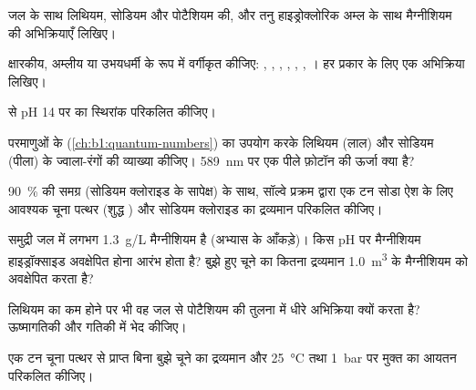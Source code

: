 \begin{exercise}[$\star$]\label{exo:b1:s-block:2}
जल के साथ लिथियम, सोडियम और पोटैशियम की, और तनु हाइड्रोक्लोरिक अम्ल के साथ
मैग्नीशियम की अभिक्रियाएँ लिखिए।
\end{exercise}

\begin{exercise}[$\star$]\label{exo:b1:s-block:3}
क्षारकीय, अम्लीय या उभयधर्मी के रूप में वर्गीकृत कीजिए: , , ,
, , , । हर प्रकार के लिए एक अभिक्रिया लिखिए।
\end{exercise}

\begin{exercise}[$\star$]\label{exo:b1:s-block:4}
 से pH 14 पर  का
स्थिरांक परिकलित कीजिए।
\end{exercise}

\begin{exercise}[$\star\star$]\label{exo:b1:s-block:5}
परमाणुओं के  (\cref{ch:b1:quantum-numbers}) का उपयोग करके लिथियम (लाल) और सोडियम (पीला)
के ज्वाला-रंगों की व्याख्या कीजिए। \qty{589}{nm} पर एक पीले फ़ोटॉन की ऊर्जा
क्या है?
\end{exercise}

\begin{exercise}[$\star\star$]\label{exo:b1:s-block:6}
\qty{90}{\percent} की समग्र  (सोडियम क्लोराइड के सापेक्ष) के साथ, सॉल्वे प्रक्रम द्वारा
एक टन सोडा ऐश के लिए आवश्यक चूना पत्थर (शुद्ध ) और सोडियम क्लोराइड का
द्रव्यमान परिकलित कीजिए।
\end{exercise}

\begin{exercise}[$\star\star$]\label{exo:b1:s-block:7}
समुद्री जल में लगभग \qty{1.3}{g/L} मैग्नीशियम है (अभ्यास के
आँकड़े)। किस pH पर मैग्नीशियम हाइड्रॉक्साइड अवक्षेपित होना आरंभ होता है?
बुझे हुए चूने का कितना द्रव्यमान \qty{1.0}{m^3} के मैग्नीशियम को अवक्षेपित करता है?
\end{exercise}

\begin{exercise}[$\star\star$]\label{exo:b1:s-block:8}
लिथियम का  कम होने पर भी वह जल से पोटैशियम की तुलना में धीरे
अभिक्रिया क्यों करता है? ऊष्मागतिकी और गतिकी में भेद कीजिए।
\end{exercise}

\begin{exercise}[$\star\star$]\label{exo:b1:s-block:9}
एक टन चूना पत्थर से प्राप्त बिना बुझे चूने का द्रव्यमान और
\qty{25}{\celsius} तथा \qty{1}{bar} पर मुक्त  का आयतन परिकलित कीजिए।
\end{exercise}

